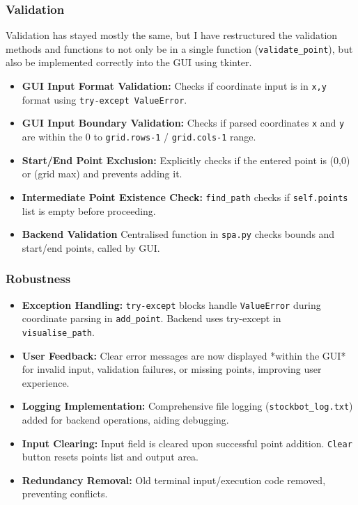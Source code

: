 \subsubsection{Validation}

Validation has stayed mostly the same, but I have restructured the validation methods and functions to not only be in a single function (\verb|validate_point|), but also be implemented correctly into the GUI using tkinter.

\begin{itemize}
	\item \textbf{GUI Input Format Validation:} Checks if coordinate input is in \verb|x,y| format using \verb|try-except ValueError|.
	\item \textbf{GUI Input Boundary Validation:} Checks if parsed coordinates \verb|x| and \verb|y| are within the 0 to \verb|grid.rows-1| / \verb|grid.cols-1| range.
	\item \textbf{Start/End Point Exclusion:} Explicitly checks if the entered point is (0,0) or (grid max) and prevents adding it.
	\item \textbf{Intermediate Point Existence Check:} \verb|find_path| checks if \verb|self.points| list is empty before proceeding.
	\item \textbf{Backend Validation} Centralised function in \verb|spa.py| checks bounds and start/end points, called by GUI.
\end{itemize}

\subsubsection{Robustness}
\begin{itemize}
	\item \textbf{Exception Handling:} \verb|try-except| blocks handle \verb|ValueError| during coordinate parsing in \verb|add_point|. Backend uses try-except in \verb|visualise_path|.
	\item \textbf{User Feedback:} Clear error messages are now displayed *within the GUI* for invalid input, validation failures, or missing points, improving user experience.
	\item \textbf{Logging Implementation:} Comprehensive file logging (\verb|stockbot_log.txt|) added for backend operations, aiding debugging.
	\item \textbf{Input Clearing:} Input field is cleared upon successful point addition. \verb|Clear| button resets points list and output area.
	\item \textbf{Redundancy Removal:} Old terminal input/execution code removed, preventing conflicts.
\end{itemize}

